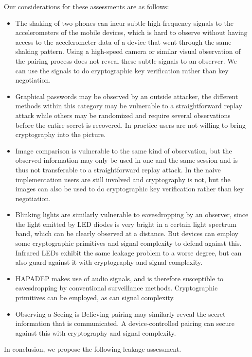 \documentclass[conference, 11pt]{sty/IEEEtran}
\begin{document}
Our considerations for these assessments are as follows:
\begin{itemize}
	\item The shaking of two phones can incur subtle high-frequency signals to the accelerometers of the mobile devices, which is hard to observe without having access to the accelerometer data of a device that went through the same shaking pattern.
	Using a high-speed camera or similar visual observation of the pairing process does not reveal these subtle signals to an observer.
	We can use the signals to do cryptographic key verification rather than key negotiation.

	\item Graphical passwords may be observed by an outside attacker, the different methods within this category may be vulnerable to a straightforward replay attack while others may be randomized and require several observations before the entire secret is recovered. In practice users are not willing to bring cryptography into the picture.
	\item Image comparison is vulnerable to the same kind of observation, but the observed information may only be used in one and the same session and is thus not transferable to a straightforward replay attack.
	In the naive implementation users are still involved and cryptography is not, but the images can also be used to do cryptographic key verification rather than key negotiation.
	\item Blinking lights are similarly vulnerable to eavesdropping by an observer, since the light emitted by LED diodes is very bright in a certain light spectrum band, which can be clearly observed at a distance. But devices can employ some cryptographic primitives and signal complexity to defend against this.
	Infrared LEDs exhibit the same leakage problem to a worse degree, but can also guard against it with cryptography and signal complexity.
	\item HAPADEP makes use of audio signals, and is therefore susceptible to eavesdropping by conventional surveillance methods. Cryptographic primitives can be employed, as can signal complexity.
	\item Observing a Seeing is Believing pairing may similarly reveal the secret information that is communicated. A device-controlled pairing can secure against this with cryptography and signal complexity.
\end{itemize}

In conclusion, we propose the following leakage assessment.
\end{document}
